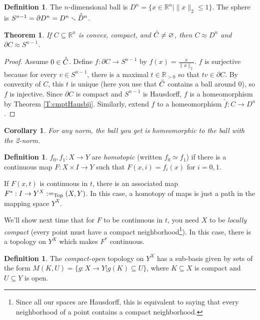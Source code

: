 \documentclass[12pt]{article}
\theoremstyle{plain}
\newtheorem{theorem}[equation]{Theorem}
\newtheorem{corollary}[equation]{Corollary}
\theoremstyle{definition}
\newtheorem{definition}[equation]{Definition}
\theoremstyle{remark}
\let\hom\relax %
\DeclareMathOperator{\hom}{Hom}
\newcommand{\inn}[1]{\accentset{\circ}{#1}}
\newcommand{\RR}{\ensuremath{\mathbb{R}}}
\begin{document}
 \begin{definition}
   The $n$-dimensional ball is $D^n = \{x\in \RR^n | \|x\|_2\le 1\}$. The sphere is
   $S^{n-1} = \partial D^n = D^n\smallsetminus \inn D^n$.
 \end{definition}
 \begin{theorem}
   If $C\subseteq \RR^n$ is convex, compact, and $\inn C\neq \varnothing$, then $C\approx
   D^n$ and $\partial C\approx S^{n-1}$.
 \end{theorem}
 \begin{proof}
   Assume $0\in \inn C$. Define $f:\partial C\to S^{n-1}$ by $f(x) = \frac{x}{\|x\|_2}$.
   $f$ is surjective because for every $v\in S^{n-1}$, there is a maximal $t\in \RR_{>0}$
   so that $tv\in \partial C$. By convexity of $C$, this $t$ is unique (here you use that
   $\inn C$ contains a ball around $0$), so $f$ is injective. Since $\partial C$ is
   compact and $S^{n-1}$ is Hausdorff, $f$ is a homeomorphism by Theorem
   \ref{T:cmptHausbij}. Similarly, extend $f$ to a homeomorphism $\tilde f:C\to D^n$.
 \end{proof}
 \begin{corollary}
   For any norm, the ball you get is homeomorphic to the ball with the 2-norm.
 \end{corollary}
 \begin{definition}
   $f_0,f_1:X\to Y$ are \emph{homotopic} (written $f_0 \simeq f_1$) if there is a
   continuous map $F:X\times I \to Y$ such that $F(x,i)=f_i(x)$ for $i=0,1$.
 \end{definition}
 If $F(x,t)$ is continuous in $t$, there is an associated map $F^*:I\to
 Y^X:=\hom_\text{Top}(X,Y)$. In this case, a homotopy of maps is just a path in the
 mapping space $Y^X$.

 We'll show next time that for $F$ to be continuous in $t$, you need $X$ to be
 \emph{locally compact} (every point must have a compact neighborhood\footnote{Since all
 our spaces are Hausdorff, this is equivalent to saying that every neighborhood of a
 point contains a compact neighborhood.}). In this case, there is a topology on $Y^X$
 which makes $F^*$ continuous.
 \begin{definition}
   The \emph{compact-open} topology on $Y^X$ has a sub-basis given by sets of the form
   $M(K,U)=\{g:X\to Y|g(K)\subseteq U\}$, where $K\subseteq X$ is compact and $U\subseteq
   Y$ is open.
 \end{definition}
\end{document}
